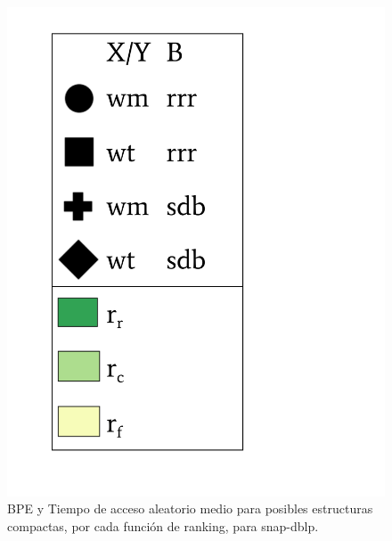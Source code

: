 \begin{frame}
\begin{figure}
\begin{minipage}{1\textwidth}
\begin{minipage}{0.15\textwidth}
    			\includegraphics[scale=.15, clip, trim=70 0 0 0]{../img/sdsl/label.pdf}
    		\end{minipage}	
    	\end{minipage}

	\caption{BPE y Tiempo de acceso aleatorio medio para posibles estructuras compactas, por cada función de ranking, para snap-dblp.}
\end{figure}

\end{frame}

